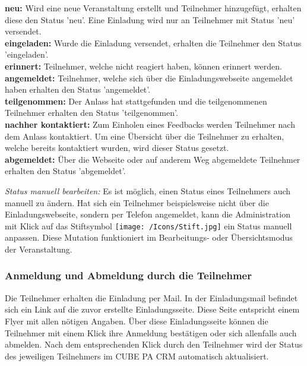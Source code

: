 \textbf{neu:} Wird eine neue Veranstaltung erstellt und Teilnehmer hinzugefügt, erhalten diese den Status 'neu'. Eine Einladung wird nur an Teilnehmer mit Status 'neu' versendet.\\
\textbf{eingeladen:} Wurde die Einladung versendet, erhalten die Teilnehmer den Status 'eingeladen'.\\
\textbf{erinnert:} Teilnehmer, welche nicht reagiert haben, können erinnert werden.\\
\textbf{angemeldet:} Teilnehmer, welche sich über die Einladungswebseite angemeldet haben erhalten den Status 'angemeldet'.\\
\textbf{teilgenommen:} Der Anlass hat stattgefunden und die teilgenommenen Teilnehmer erhalten den Status 'teilgenommen'.\\
\textbf{nachher kontaktiert:} Zum Einholen eines Feedbacks werden Teilnehmer nach dem Anlass kontaktiert. Um eine Übersicht über die Teilnehmer zu erhalten, welche bereits kontaktiert wurden, wird dieser Status gesetzt.\\
\textbf{abgemeldet:} Über die Webseite oder auf anderem Weg abgemeldete Teilnehmer erhalten den Status 'abgemeldet'.

\vspace{\baselineskip}

\textit{Status manuell bearbeiten:} Es ist möglich, einen Status eines Teilnehmers auch manuell zu ändern. Hat sich ein Teilnehmer beispielsweise nicht über die Einladungswebseite, sondern per Telefon angemeldet, kann die Administration mit Klick auf das Stiftsymbol \texttt{[image: /Icons/Stift.jpg]} ein Status manuell anpassen. Diese Mutation funktioniert im Bearbeitungs- oder Übersichtsmodus der Veranstaltung.

\subsubsection{Anmeldung und Abmeldung durch die Teilnehmer}

Die Teilnehmer erhalten die Einladung per Mail. In der Einladungsmail befindet sich ein Link auf die zuvor erstellte Einladungsseite. Diese Seite entspricht einem Flyer mit allen nötigen Angaben. Über diese Einladungsseite können die Teilnehmer mit einem Klick ihre Anmeldung bestätigen oder sich allenfalls auch abmelden. Nach dem entsprechenden Klick durch den Teilnehmer wird der Status des jeweiligen Teilnehmers im CUBE PA CRM automatisch aktualisiert. 


